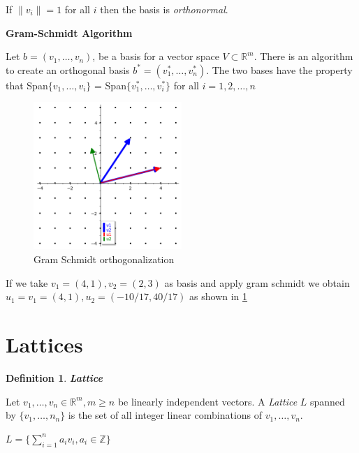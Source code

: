 \documentclass[a4paper,12pt]{report}
\newtheorem{definition}{Definition}[section]
\newcommand{\R}{\mathbb{R}}
\newcommand{\Z}{\mathbb{Z}}
\begin{document}
If $\lVert v_i \rVert = 1$ for all $i$ then the basis is \textit{orthonormal}.

\begin{algorithm}
    \textbf{Gram-Schmidt Algorithm}
\end{algorithm}

Let $b = (v_1, \ldots, v_n)$, be a basis for a vector space $V \subset \R^m$. There is an algorithm to create an orthogonal basis
$b^* = (v_1^*,\ldots,v_n^*)$.
The two bases have the property that Span$\{v_1,\ldots,v_i\}$ = Span$\{v_1^*,\ldots,v_i^*\}$ for all $i = 1,2,\ldots,n$

\begin{figure}[htpb]
    \centering
    \includegraphics[width=0.5\textwidth]{./img/gram_schmidt.png}
    \caption{Gram Schmidt orthogonalization}
    \label{fig:gram_schmidt}
\end{figure}

If we take $v_1=(4, 1), v_2=(2, 3)$ as basis and apply gram schmidt we obtain $u_1=v_1=(4, 1), u_2=(-10/17, 40/17)$ as shown in \ref{fig:gram_schmidt}

\section{Lattices}

\begin{definition}
    \textbf{Lattice}
\end{definition}

Let $v_1,\ldots,v_n \in \R^m, m \ge n$ be linearly independent vectors. A \textit{Lattice} $L$ spanned by $\{v_1,\ldots,n_n\}$ is the set of 
all integer linear combinations of $v_1,\ldots,v_n$.

\begin{center}
    $L = \bigg\{\sum_{i=1}^{n} a_iv_i, a_i \in \Z \bigg\}$
\end{center}
\end{document}
